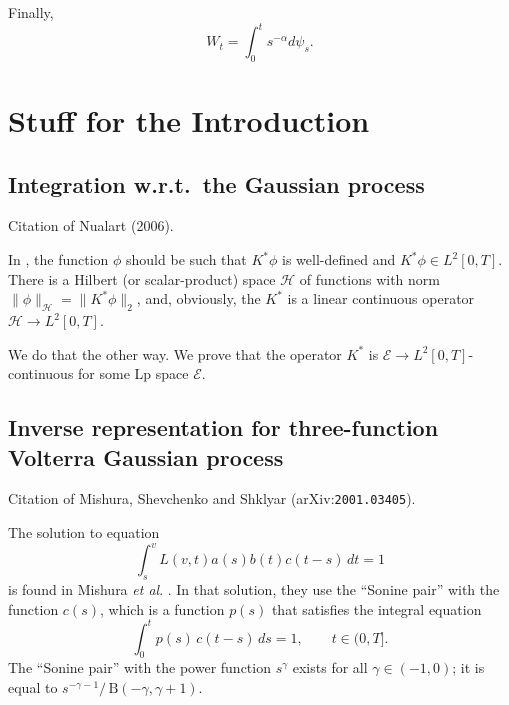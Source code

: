 \documentclass{article}
\newcommand{\vS}{v}
\theoremstyle{plain}
\theoremstyle{remark}
\theoremstyle{definition}
\begin{document}
Finally,
\[
W_t = \int_0^t s^{-\alpha} d\psi_s .
\]

\section{Stuff for the Introduction}
\subsection{Integration w.r.t.~the Gaussian process}
Citation of Nualart (2006).

In \cite{Nualart2006}, the function $\phi$
should be such that
$K^* \phi$ is well-defined and
$K^* \phi \in L^2[0,T]$.
There is a Hilbert (or scalar-product) space $\mathcal{H}$
of functions with norm $\|\phi\|_{\mathcal H} = \|K^* \phi\|_2$,
and, obviously, the $K^*$ is a linear
continuous operator $\mathcal{H} \to L^2[0,T]$.

We do that the other way.
We prove that the operator $K^*$ is
$\mathcal{E} \to L^2[0,T]$-continuous
for some Lp space $\mathcal{E}$.

\subsection{Inverse representation for
three-function Volterra Gaussian process}
Citation of Mishura, Shevchenko and Shklyar (arXiv:\texttt{2001.03405}).

The solution to equation
\[
\int_s^\vS L(\vS,t) a(s) b(t) c(t-s) \, dt = 1
\]
is found in
Mishura \textit{et al}.\@{} \cite[Proposition 3]{arXiv03405}.
In that solution, they use the ``Sonine pair'' with the function $c(s)$, which is
a function $p(s)$ that satisfies the integral equation
\[
\int_0^t p(s) \, c(t-s) \, ds = 1, \qquad t\in(0,T].
\]
The ``Sonine pair'' with the power function $s^\gamma$ exists for all $\gamma\in(-1,0)$;
it is equal to $s^{-\gamma-1} / \, \mathrm{B}(-\gamma, \gamma{+}1)$.
\end{document}
